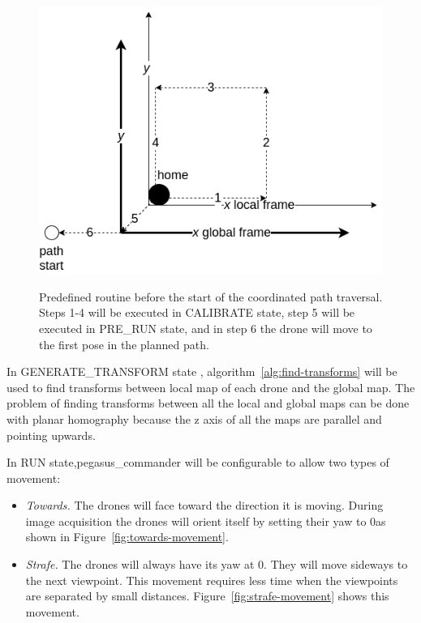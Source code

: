 \begin{figure}
	\centering
	\caption[Predefined routine before the start of the coordinated path traversal]{\small Predefined routine before the start of the coordinated path traversal. Steps 1-4 will be executed in CALIBRATE state, step 5 will be executed in PRE\_RUN state, and in step 6 the drone will move to the first pose in the planned path.} 
	\includegraphics[width=5in]{figures/methodology/methodology-calibration-routine}
	\label{fig:calibration-routine}
\end{figure}

In GENERATE\_TRANSFORM state , algorithm~\ref{alg:find-transforms} will be used to find transforms between local map of each drone and the global map. The problem of finding transforms between all the local and global maps can be done with planar homography because the z axis of all the maps are parallel and pointing upwards.

In RUN state,pegasus\_commander will be configurable to allow two types of movement:
\begin{itemize}
	\item \textit{Towards.} The drones will face toward the direction it is moving. During image acquisition the drones will orient itself by setting their yaw to 0\degree as shown in Figure~\ref{fig:towards-movement}.
	\item \textit{Strafe.} The drones will always have its yaw at 0\degree. They will move sideways to the next viewpoint. This movement requires less time when the viewpoints are separated by small distances. Figure~\ref{fig:strafe-movement} shows this movement.
\end{itemize}

